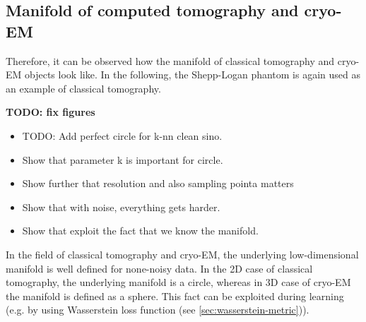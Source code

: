 \subsection{Manifold of computed tomography and cryo-EM}

Therefore, it can be observed how the manifold of classical tomography and cryo-EM objects look like.
In the following, the Shepp-Logan phantom is again used as an example of classical tomography.

\textbf{TODO: fix figures}
\begin{itemize}
    
    \item TODO: Add perfect circle for k-nn clean sino.
    \item Show that parameter k is important for circle.
    \item Show further that resolution and also sampling pointa matters
    \item Show that with noise, everything gets harder.
    \item Show that exploit the fact that we know the manifold.
\end{itemize}







\begin{tcolorbox}[colback=red!5!white,colframe=red!75!black]
    In the field of classical tomography and cryo-EM, the underlying low-dimensional manifold is well defined for none-noisy data.
    In the 2D case of classical tomography, the underlying manifold is a circle, whereas in 3D case of cryo-EM the manifold
    is defined as a sphere.
    This fact can be exploited during learning (e.g. by using Wasserstein loss function (see \ref{sec:wasserstein-metric})).
\end{tcolorbox}

